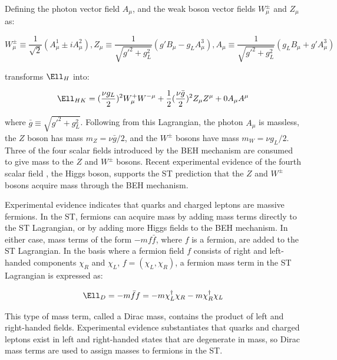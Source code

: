 Defining the photon vector field $A_{\mu}$, and the weak boson vector fields $W^{\pm}_{\mu}$ and $Z_{\mu}$ as:

\begin{equation}
	W^{\pm}_{\mu} \equiv \frac{1}{\sqrt{2}}(A^{1}_{\mu} \pm iA^{2}_{\mu}), 
	Z_{\mu} \equiv \frac{1}{\sqrt{g'^{2} + g^{2}_{L}}}(g'B_{\mu} - g_{L}A^{3}_{\mu}), 
	A_{\mu} \equiv \frac{1}{\sqrt{g'^{2} + g^{2}_{L}}}(g_{L}B_{\mu} + g'A^{3}_{\mu})
\end{equation}

transforms $\Ell_{H}$ into:

\begin{equation}
	\Ell_{HK} = (\frac{\nu g_{L}}{2})^{2}W^{+}_{\mu}W^{-\mu} + \frac{1}{2}(\frac{\nu \bar{g}}{2})^{2}Z_{\mu}Z^{\mu} + 0A_{\mu}A^{\mu}
\end{equation}

where $\bar{g} \equiv \sqrt{g'^{2} + g^{2}_{L}}$.  Following from this Lagrangian, the photon $A_{\mu}$ is massless, 
the $Z$ boson has mass $m_{Z} = \nu\bar{g}/2$, and the $W^{\pm}$ bosons have mass $m_{W} = \nu g_{L}/2$.  
Three of the four scalar fields introduced by the BEH mechanism are consumed to give mass to the $Z$ 
and $W^{\pm}$ bosons.  Recent experimental evidence of the fourth scalar field \cite{combinedHiggsResult}, the Higgs boson, 
supports the ST prediction that the $Z$ and $W^{\pm}$ bosons acquire mass through the BEH mechanism.

Experimental evidence indicates that quarks and charged leptons are massive fermions.  In the ST, fermions 
can acquire mass by adding mass terms directly to the ST Lagrangian, or by adding more Higgs fields to the 
BEH mechanism.  In either case, mass terms of the form $-mf\bar{f}$, where $f$ is a fermion, are added to 
the ST Lagrangian.  In the basis where a fermion field $f$ consists of right and left-handed components $\chi_{R}$ 
and $\chi_{L}$, $f = (\chi_{L},\chi_{R})$, a fermion mass term in the ST Lagrangian is expressed as:

\begin{equation}
	\Ell_{D} = -m\bar{f}f = -m\chi^{\dagger}_{L}\chi_{R} - m\chi^{\dagger}_{R}\chi_{L}
\end{equation}

This type of mass term, called a Dirac mass, contains the product of left and right-handed fields.  Experimental 
evidence substantiates that quarks and charged leptons exist in left and right-handed states that are degenerate 
in mass, so Dirac mass terms are used to assign masses to fermions in the ST.

